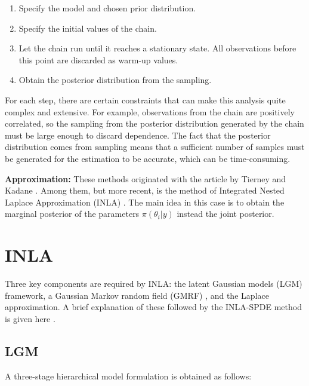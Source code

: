 \documentclass[
]{book}
\providecommand{\tightlist}{%
  \setlength{\itemsep}{0pt}\setlength{\parskip}{0pt}}
\begin{document}
\begin{enumerate}
\def\labelenumi{\arabic{enumi}.}
\tightlist
\item
  Specify the model and chosen prior distribution.
\item
  Specify the initial values of the chain.
\item
  Let the chain run until it reaches a stationary state. All observations before this point are discarded as warm-up values.
\item
  Obtain the posterior distribution from the sampling.
\end{enumerate}

For each step, there are certain constraints that can make this analysis quite complex and extensive. For example, observations from the chain are positively correlated, so the sampling from the posterior distribution generated by the chain must be large enough to discard dependence. The fact that the posterior distribution comes from sampling means that a sufficient number of samples must be generated for the estimation to be accurate, which can be time-consuming.

\textbf{Approximation:} These methods originated with the article by Tierney and Kadane \citep{tierney_accurate_1986}. Among them, but more recent, is the method of Integrated Nested Laplace Approximation (INLA) \citep{rue_approximate_2009}. The main idea in this case is to obtain the marginal posterior of the parameters \(\pi(\theta_i|y)\) instead the joint posterior.

\hypertarget{inla}{%
\section*{INLA}\label{inla}}

Three key components are required by INLA: the latent Gaussian models (LGM) framework, a Gaussian Markov random field (GMRF) \citep{rue_gaussian_2005}, and the Laplace approximation. A brief explanation of these followed by the INLA-SPDE method is given here \citep{krainski_advanced_2018, lindgren_explicit_2011}.

\hypertarget{lgm}{%
\subsection*{LGM}\label{lgm}}

A three-stage hierarchical model formulation is obtained as follows:
\end{document}
